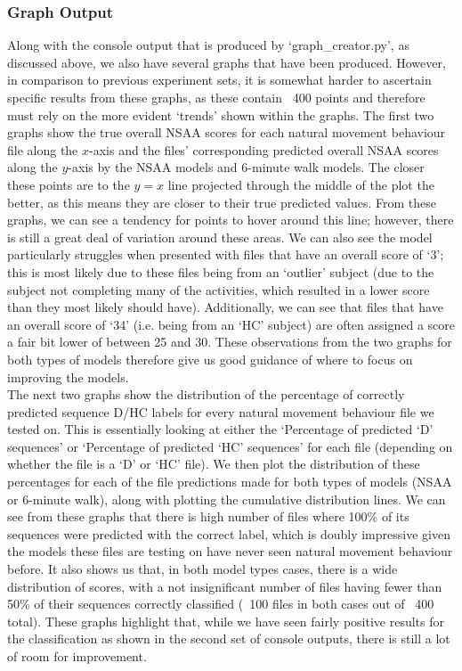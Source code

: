 \documentclass[12pt,twoside]{report}
\begin{document}
\subsubsection{Graph Output}

\quad Along with the console output that is produced by ‘graph\_creator.py’, as discussed above, we also have several graphs that have been produced. However, in comparison to previous experiment sets, it is somewhat harder to ascertain specific results from these graphs, as these contain ~400 points and therefore must rely on the more evident ‘trends’ shown within the graphs. The first two graphs show the true overall NSAA scores for each natural movement behaviour file along the $x$-axis and the files’ corresponding predicted overall NSAA scores along the $y$-axis by the NSAA models and 6-minute walk models. The closer these points are to the $y=x$ line projected through the middle of the plot the better, as this means they are closer to their true predicted values. From these graphs, we can see a tendency for points to hover around this line; however, there is still a great deal of variation around these areas. We can also see the model particularly struggles when presented with files that have an overall score of ‘3’; this is most likely due to these files being from an ‘outlier’ subject (due to the subject not completing many of the activities, which resulted in a lower score than they most likely should have). Additionally, we can see that files that have an overall score of ‘34’ (i.e. being from an ‘HC’ subject) are often assigned a score a fair bit lower of between 25 and 30. These observations from the two graphs for both types of models therefore give us good guidance of where to focus on improving the models.\\

\quad The next two graphs show the distribution of the percentage of correctly predicted sequence D/HC labels for every natural movement behaviour file we tested on. This is essentially looking at either the ‘Percentage of predicted ‘D’ sequences’ or ‘Percentage of predicted ‘HC’ sequences’ for each file (depending on whether the file is a ‘D’ or ‘HC’ file). We then plot the distribution of these percentages for each of the file predictions made for both types of models (NSAA or 6-minute walk), along with plotting the cumulative distribution lines. We can see from these graphs that there is high number of files where 100\% of its sequences were predicted with the correct label, which is doubly impressive given the models these files are testing on have never seen natural movement behaviour before. It also shows us that, in both model types cases, there is a wide distribution of scores, with a not insignificant number of files having fewer than 50\% of their sequences correctly classified (~100 files in both cases out of ~400 total). These graphs highlight that, while we have seen fairly positive results for the classification as shown in the second set of console outputs, there is still a lot of room for improvement.\\
\end{document}

